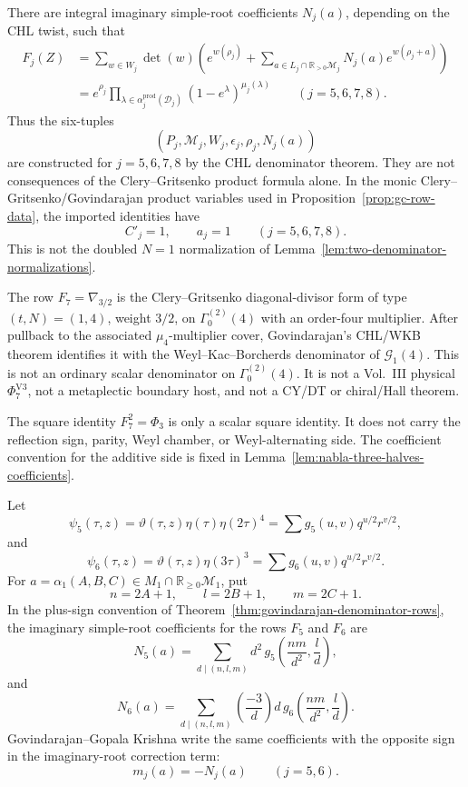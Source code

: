 \documentclass[11pt]{memoir}
\newcommand{\R}{\mathbb{R}} \newcommand{\La}{\Lambda}
\begin{document}
\begin{theorem}
There are integral imaginary simple-root coefficients $N_j(a)$,
depending on the CHL twist, such that
$$
\begin{aligned}
F_j(Z)
&=\sum_{w\in W_j}\det(w)
\left(e^{w(\rho_j)}
+\sum_{a\in L_j\cap\R_{>0}\mathcal M_j}
N_j(a)e^{w(\rho_j+a)}\right)\\
&=e^{\rho_j}
\prod_{\lambda\in\alpha_j^{\mathrm{prod}}(\mathcal D_j)}
\left(1-e^\lambda\right)^{\mu_j(\lambda)}
\qquad(j=5,6,7,8).
\end{aligned}
$$
Thus the six-tuples
$$
(P_j,\mathcal M_j,W_j,\epsilon_j,\rho_j,N_j(a))
$$
are constructed for $j=5,6,7,8$ by the CHL denominator theorem.  They are
not consequences of the Clery--Gritsenko product formula alone.
In the monic Clery--Gritsenko/Govindarajan product variables used in
Proposition~\ref{prop:gc-row-data}, the imported identities have
$$
C'_j=1,\qquad a_j=1\qquad(j=5,6,7,8).
$$
This is not the doubled $N=1$ normalization of
Lemma~\ref{lem:two-denominator-normalizations}.
\end{theorem}

\begin{remark}
\label{rem:f7-mu4-cover}
The row \(F_7=\nabla_{3/2}\) is the Clery--Gritsenko
diagonal-divisor form of type \((t,N)=(1,4)\), weight \(3/2\), on
\(\Gamma_0^{(2)}(4)\) with an order-four multiplier.  After pullback to
the associated \(\mu_4\)-multiplier cover, Govindarajan's CHL/WKB
theorem identifies it with the Weyl--Kac--Borcherds denominator of
\(\mathcal G_1(4)\).  This is not an ordinary scalar denominator on
\(\Gamma_0^{(2)}(4)\).  It is not a Vol.~III physical
\(\Phi^{\mathrm{V3}}_7\), not a metaplectic boundary host, and not a
CY/DT or chiral/Hall theorem.

The square identity \(F_7^2=\Phi_3\) is only a scalar square identity.
It does not carry the reflection sign, parity, Weyl chamber, or
Weyl-alternating side.  The coefficient convention for the additive
side is fixed in Lemma~\ref{lem:nabla-three-halves-coefficients}.
\end{remark}

\begin{lemma}
\label{lem:nabla32-coefficients}
Let
$$
\psi_5(\tau,z)=\vartheta(\tau,z)\eta(\tau)\eta(2\tau)^4
=\sum g_5(u,v)q^{u/2}r^{v/2},
$$
and
$$
\psi_6(\tau,z)=\vartheta(\tau,z)\eta(3\tau)^3
=\sum g_6(u,v)q^{u/2}r^{v/2}.
$$
For $a=\alpha_1(A,B,C)\in M_1\cap\R_{\ge0}\mathcal M_1$, put
$$
n=2A+1,\qquad l=2B+1,\qquad m=2C+1.
$$
In the plus-sign convention of
Theorem~\ref{thm:govindarajan-denominator-rows}, the imaginary
simple-root coefficients for the rows $F_5$ and $F_6$ are
$$
N_5(a)=\sum_{d\mid(n,l,m)}
d^2\,g_5\left(\frac{nm}{d^2},\frac ld\right),
$$
and
$$
N_6(a)=\sum_{d\mid(n,l,m)}
\left(\frac{-3}{d}\right)d\,
g_6\left(\frac{nm}{d^2},\frac ld\right).
$$
Govindarajan--Gopala Krishna write the same coefficients with the
opposite sign in the imaginary-root correction term:
$$m_j(a)=-N_j(a)\qquad(j=5,6).$$
\end{lemma}
\end{document}
